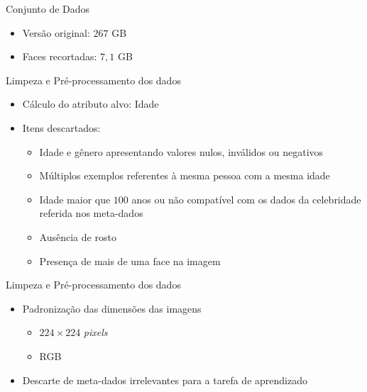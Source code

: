 \begin{frame}{Conjunto de Dados}
     \begin{itemize}
          \item Versão original: $267$ GB
          \item Faces recortadas: $7,1$ GB
     \end{itemize}
\end{frame}

\begin{frame}{Limpeza e Pré-processamento dos dados}
     \begin{itemize}
          \item Cálculo do atributo alvo: \alert{Idade}
          \item Itens descartados:
          \begin{itemize}
               \item Idade e gênero apresentando valores nulos, inválidos ou negativos
               \item Múltiplos exemplos referentes à mesma pessoa com a mesma idade
               \item Idade maior que $100$ anos ou não compatível com os dados da celebridade referida nos meta-dados
               \item Ausência de rosto
               \item Presença de mais de uma face na imagem
          \end{itemize}
     \end{itemize}
\end{frame}

\begin{frame}{Limpeza e Pré-processamento dos dados}
     \begin{itemize}
          \item Padronização das dimensões das imagens
          \begin{itemize}
               \item $224 \times 224$ \emph{pixels}
               \item RGB
          \end{itemize}
          \item Descarte de meta-dados irrelevantes para a tarefa de aprendizado
     \end{itemize}
\end{frame}

